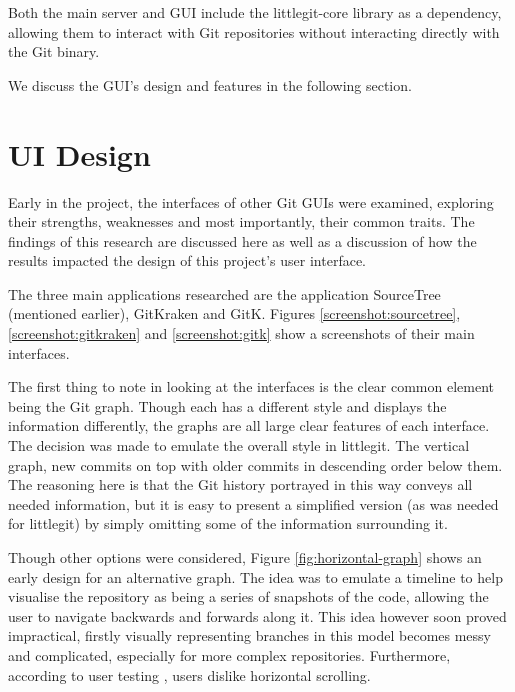 Both the main server and GUI include the littlegit-core library as a dependency, allowing them to interact with Git repositories without interacting directly with the Git binary. 

We discuss the GUI's design and features in the following section.

\section{UI Design}
 
Early in the project, the interfaces of other Git GUIs were examined, exploring their strengths, weaknesses and most importantly, their common traits. The findings of this research are discussed here as well as a discussion of how the results impacted the design of this project's user interface.

The three main applications researched are the application SourceTree \cite{sourcetree} (mentioned earlier), GitKraken\cite{gitkraken} and GitK\cite{gitk}. Figures \ref{screenshot:sourcetree}, \ref{screenshot:gitkraken} and \ref{screenshot:gitk} show a screenshots of their main interfaces.




The first thing to note in looking at the interfaces is the clear common element being the Git graph. Though each has a different style and displays the information differently, the graphs are all large clear features of each interface. The decision was made to emulate the overall style in littlegit. The vertical graph, new commits on top with older commits in descending order below them. The reasoning here is that the Git history portrayed in this way conveys all needed information, but it is easy to present a simplified version (as was needed for littlegit) by simply omitting some of the information surrounding it.

Though other options were considered, Figure \ref{fig:horizontal-graph} shows an early design for an alternative graph. The idea was to emulate a timeline to help visualise the repository as being a series of snapshots of the code, allowing the user to navigate backwards and forwards along it. This idea however soon proved impractical, firstly visually representing branches in this model becomes messy and complicated, especially for more complex repositories. Furthermore, according to user testing \cite{horizontalScrolling}, users dislike horizontal scrolling.

